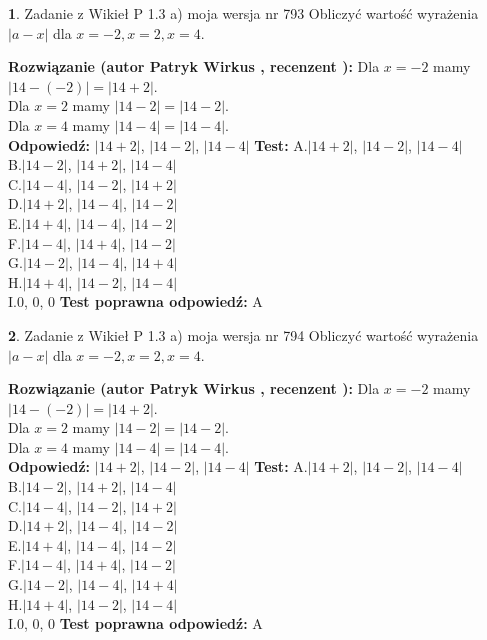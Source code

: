 \documentclass[12pt, a4paper]{article}
\theoremstyle{definition} %
\newtheorem{zad}{}
\newcommand{\zadStart}[1]{\begin{zad}#1\newline}
\newcommand{\zadStop}{\end{zad}}
\newcommand{\rozwStart}[2]{\noindent \textbf{Rozwiązanie (autor #1 , recenzent #2): }\newline}
\newcommand{\rozwStop}{\newline}
\newcommand{\odpStart}{\noindent \textbf{Odpowiedź:}\newline}
\newcommand{\odpStop}{\newline}
\newcommand{\testStart}{\noindent \textbf{Test:}\newline}
\newcommand{\testStop}{\newline}
\newcommand{\kluczStart}{\noindent \textbf{Test poprawna odpowiedź:}\newline}
\newcommand{\kluczStop}{\newline}
\begin{document}
\zadStart{Zadanie z Wikieł P 1.3 a) moja wersja nr 793}
Obliczyć wartość wyrażenia $|a - x|$ dla $x=-2,x=2,x=4$.
\zadStop
\rozwStart{Patryk Wirkus}{}
Dla $x = -2$ mamy $|14 - (-2)| = |14 + 2|$.\\
Dla $x = 2$ mamy $|14 - 2| = |14 - 2|$.\\
Dla $x = 4$ mamy $|14 - 4| = |14 - 4|$.\\
\rozwStop
\odpStart
$|14 + 2|$, $|14 - 2|$, $|14 - 4|$
\odpStop
\testStart
A.$|14 + 2|$, $|14 - 2|$, $|14 - 4|$\\
B.$|14 - 2|$, $|14 + 2|$, $|14 - 4|$\\
C.$|14 - 4|$, $|14 - 2|$, $|14 + 2|$\\
D.$|14 + 2|$, $|14 - 4|$, $|14 - 2|$\\
E.$|14 + 4|$, $|14 - 4|$, $|14 - 2|$\\
F.$|14 - 4|$, $|14 + 4|$, $|14 - 2|$\\
G.$|14 - 2|$, $|14 - 4|$, $|14 + 4|$\\
H.$|14 + 4|$, $|14 - 2|$, $|14 - 4|$\\
I.$0$, $0$, $0$
\testStop
\kluczStart
A
\kluczStop



\zadStart{Zadanie z Wikieł P 1.3 a) moja wersja nr 794}
Obliczyć wartość wyrażenia $|a - x|$ dla $x=-2,x=2,x=4$.
\zadStop
\rozwStart{Patryk Wirkus}{}
Dla $x = -2$ mamy $|14 - (-2)| = |14 + 2|$.\\
Dla $x = 2$ mamy $|14 - 2| = |14 - 2|$.\\
Dla $x = 4$ mamy $|14 - 4| = |14 - 4|$.\\
\rozwStop
\odpStart
$|14 + 2|$, $|14 - 2|$, $|14 - 4|$
\odpStop
\testStart
A.$|14 + 2|$, $|14 - 2|$, $|14 - 4|$\\
B.$|14 - 2|$, $|14 + 2|$, $|14 - 4|$\\
C.$|14 - 4|$, $|14 - 2|$, $|14 + 2|$\\
D.$|14 + 2|$, $|14 - 4|$, $|14 - 2|$\\
E.$|14 + 4|$, $|14 - 4|$, $|14 - 2|$\\
F.$|14 - 4|$, $|14 + 4|$, $|14 - 2|$\\
G.$|14 - 2|$, $|14 - 4|$, $|14 + 4|$\\
H.$|14 + 4|$, $|14 - 2|$, $|14 - 4|$\\
I.$0$, $0$, $0$
\testStop
\kluczStart
A
\kluczStop
\end{document}
